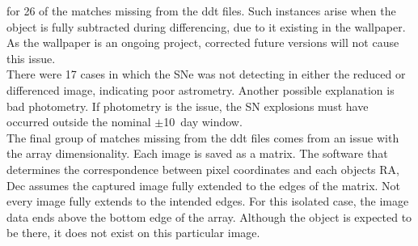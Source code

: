 for 26 of the matches missing from the ddt files. Such instances arise when the 
object is fully subtracted during differencing, due to it existing in the wallpaper.
As the wallpaper is an ongoing project, corrected future versions will not cause this issue.\\
%
%
\indent There were 17 cases in which the SNe was not detecting in either the reduced or 
differenced image, indicating poor astrometry. Another possible explanation is 
bad photometry. If photometry is the issue, the SN explosions must have occurred 
outside the nominal $\pm$10~day window.\\
%
%
\indent The final group of matches missing from the ddt files comes from an issue with 
the array dimensionality. Each image is saved as a matrix. The software that 
determines the correspondence between pixel coordinates and each objects RA, Dec 
assumes the captured image fully extended to the edges of the matrix.
Not every image fully extends to the intended edges. 
For this isolated case, the 
image data ends above the bottom edge of the array. Although the object is expected 
to be there, it does not exist on this particular image.



